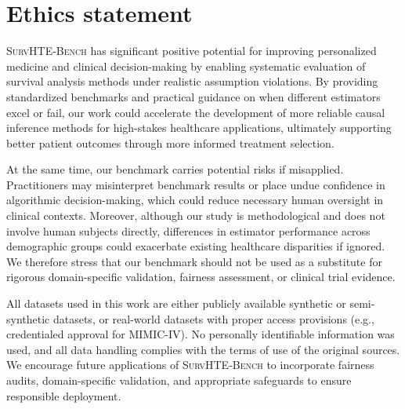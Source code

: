 \documentclass{article} %
\begin{document}
\vspace{-.5em}
\section*{Ethics statement} \label{app:ethics-statement}
\vspace{-.5em}
\textsc{SurvHTE‐Bench} has significant positive potential for improving personalized medicine and clinical decision-making by enabling systematic evaluation of survival analysis methods under realistic assumption violations. By providing standardized benchmarks and practical guidance on when different estimators excel or fail, our work could accelerate the development of more reliable causal inference methods for high-stakes healthcare applications, ultimately supporting better patient outcomes through more informed treatment selection.

At the same time, our benchmark carries potential risks if misapplied. Practitioners may misinterpret benchmark results or place undue confidence in algorithmic decision-making, which could reduce necessary human oversight in clinical contexts. Moreover, although our study is methodological and does not involve human subjects directly, differences in estimator performance across demographic groups could exacerbate existing healthcare disparities if ignored. We therefore stress that our benchmark should not be used as a substitute for rigorous domain-specific validation, fairness assessment, or clinical trial evidence. 

All datasets used in this work are either publicly available synthetic or semi-synthetic datasets, or real-world datasets with proper access provisions (e.g., credentialed approval for MIMIC-IV). No personally identifiable information was used, and all data handling complies with the terms of use of the original sources. We encourage future applications of \textsc{SurvHTE‐Bench} to incorporate fairness audits, domain-specific validation, and appropriate safeguards to ensure responsible deployment.

\vspace{-1em}
\end{document}
